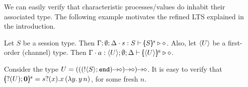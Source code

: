 \noi We can easily verify that characteristic processes/values  
do inhabit  their associated type. 
The following example motivates the refined 
LTS explained in %
the introduction.

\begin{proposition}
		Let $S$ be a session type. Then $\Gamma; \emptyset; \Delta \cdot s: S \vdash [\!\!(S)\!\!]^{s} \triangleright \diamond$.
		Also, let $\langle U \rangle$ be a first-order (channel) type. Then $\Gamma \cdot a: \langle U \rangle; \emptyset; \Delta \vdash [\!\!(\langle U \rangle)\!\!]^{a} \triangleright \diamond$.
\end{proposition}



\begin{example}
	Consider the type $U = \shot{(\shot{(\shot{(\btout{S} \tinact)})})}$.
	It is easy to verify that %
	$[\!\!(? (U) ; \mathbf{0})\!\!]^{s} = s ? (x) . x\, {(\lambda y.\,y\, {n})}$, for some fresh $n$.
\end{example}


